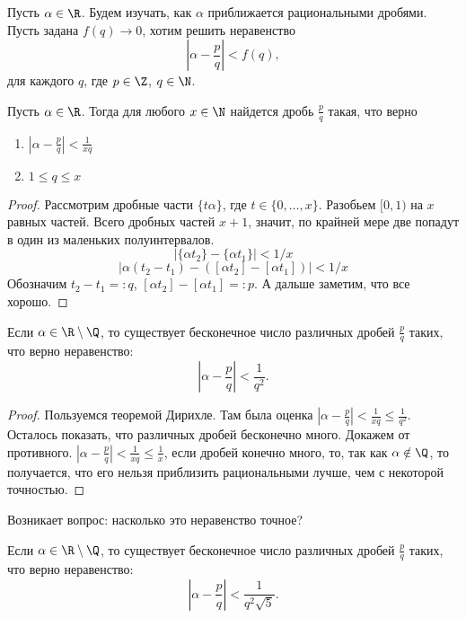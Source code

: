 Пусть $\alpha \in \R$. Будем изучать, как $\alpha$ приближается рациональными дробями. Пусть задана $f(q) \to 0$, хотим решить неравенство
$$
  \left| \alpha - \frac{p}{q}\right| < f(q),
$$
для каждого $q$, где $p \in \Z$, $q \in \N$.

\begin{theorem}[Дирихле]
  Пусть $\alpha \in \R$. Тогда для любого $x \in \N$ найдется дробь $\frac{p}{q}$ такая, что верно
  \begin{enumerate}
    \item
      $\left| \alpha - \frac {p}{q} \right| < \frac{1}{xq}$
    \item
      $1 \leqslant q \leqslant x$
  \end{enumerate}
\end{theorem}
\begin{proof}
  Рассмотрим дробные части $\{t \alpha\}$, где $t \in \{0, \ldots, x\}$. Разобьем $[0, 1)$ на $x$ равных частей. Всего дробных частей $x + 1$, значит, по крайней мере две попадут в один из маленьких полуинтервалов.
  $$
    |\{\alpha t_2\} - \{\alpha t_1\}| < 1/x
  $$
  $$
    |\alpha (t_2 - t_1) - ([\alpha t_2] - [\alpha t_1])| < 1/x
  $$
  Обозначим $t_2 - t_1 =: q$, $[\alpha t_2] - [\alpha t_1] =: p$. А дальше заметим, что все хорошо.
\end{proof}

\begin{theorem}
  Если $\alpha \in \R \setminus \Q$, то существует бесконечное число различных дробей $\frac{p}{q}$ таких, что верно неравенство:
  $$
    \left| \alpha - \frac{p}{q}\right| < \frac{1}{q^2}.
  $$
\end{theorem}
\begin{proof}
  Пользуемся теоремой Дирихле. Там была оценка $\left| \alpha - \frac {p}{q} \right| < \frac{1}{xq} \leqslant \frac{1}{q^2}$. Осталось показать, что различных дробей бесконечно много. Докажем от противного. $\left| \alpha - \frac {p}{q} \right| < \frac{1}{xq} \leqslant \frac{1}{x}$, если дробей конечно много, то, так как $\alpha \notin \Q$, то получается, что его нельзя приблизить рациональными лучше, чем с некоторой точностью.
\end{proof}

Возникает вопрос: насколько это неравенство точное?

\begin{theorem}
  Если $\alpha \in \R \setminus \Q$, то существует бесконечное число различных дробей $\frac{p}{q}$ таких, что верно неравенство:
  $$
    \left| \alpha - \frac{p}{q}\right| < \frac{1}{q^2 \sqrt{5}}.
  $$
\end{theorem}

